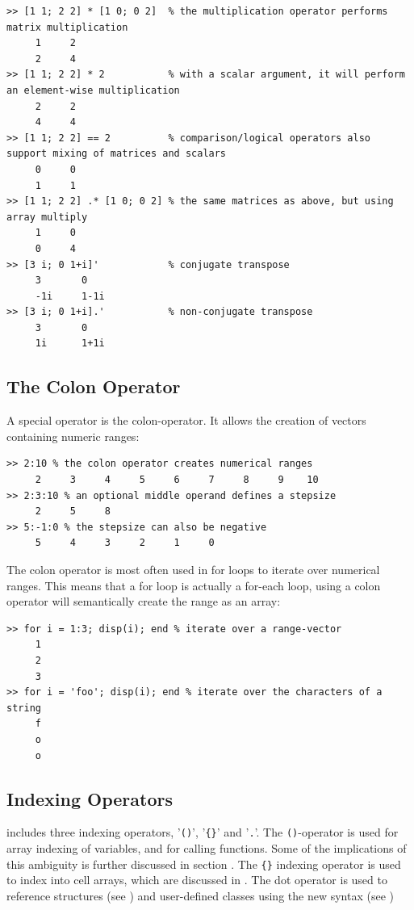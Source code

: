 \begin{lstlisting}
>> [1 1; 2 2] * [1 0; 0 2]  % the multiplication operator performs matrix multiplication
     1     2
     2     4
>> [1 1; 2 2] * 2           % with a scalar argument, it will perform an element-wise multiplication
     2     2
     4     4
>> [1 1; 2 2] == 2          % comparison/logical operators also support mixing of matrices and scalars
     0     0
     1     1
>> [1 1; 2 2] .* [1 0; 0 2] % the same matrices as above, but using array multiply
     1     0
     0     4
>> [3 i; 0 1+i]'            % conjugate transpose
     3       0          
     -1i     1-1i
>> [3 i; 0 1+i].'           % non-conjugate transpose
     3       0          
     1i      1+1i
\end{lstlisting}




\subsection{The Colon Operator}

A special operator is the colon-operator. It allows the creation of
vectors containing numeric ranges:

\begin{lstlisting}
>> 2:10 % the colon operator creates numerical ranges
     2     3     4     5     6     7     8     9    10
>> 2:3:10 % an optional middle operand defines a stepsize
     2     5     8
>> 5:-1:0 % the stepsize can also be negative
     5     4     3     2     1     0
\end{lstlisting}

The colon operator is most often used in for loops to iterate over numerical
ranges. This means that a \matlab for loop is actually a for-each loop,
using a colon operator will semantically create the range as an array:

\begin{lstlisting}
>> for i = 1:3; disp(i); end % iterate over a range-vector
     1
     2
     3
>> for i = 'foo'; disp(i); end % iterate over the characters of a string
     f
     o
     o
\end{lstlisting}


\subsection{Indexing Operators}

\matlab includes three indexing operators, '{\tt ()}', '{\tt \{\}}' and '{\tt .}'.
The {\tt ()}-operator is used for array indexing of variables, and for calling functions.
Some of the implications of this ambiguity is further discussed in section .
The {\tt \{\}} indexing operator is used to index into cell arrays, which are
discussed in . The dot operator is used to reference structures
(see ) and user-defined classes using the new syntax (see )

